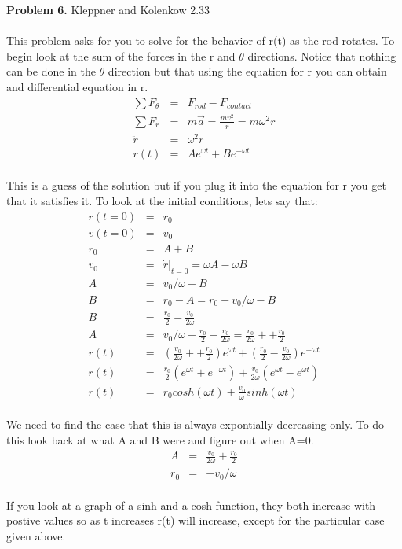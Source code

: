 \documentclass[11pt]{amsart}
\begin{document}
\textbf{Problem 6.} Kleppner and Kolenkow 2.33 \\ \\
This problem asks for you to solve for the behavior of r(t) as the rod rotates. To begin look at the sum of the forces in the r and $\theta$ directions. Notice that nothing can be done in the $\theta$ direction but that using the equation for r you can obtain and differential equation in r. \\
\begin{eqnarray*} 
\sum{F_{\theta}} &=& F_{rod}-F_{contact} \\
\sum{F_{r}} &=& m\vec{a} = \frac{mv^{2}}{r} = m\omega^{2}r \\ 
\ddot{r} &=& \omega^{2}r \\
r(t) &=& Ae^{\omega{t}}+Be^{-\omega{t}} 
\end{eqnarray*} \\
This is a guess of the solution but if you plug it into the equation for r you get that it satisfies it. To look at the initial conditions, lets say that: \\
\begin{eqnarray*}
r(t=0) &=& r_{0} \\
v(t=0) &=& v_{0} \\
r_{0} &=& A+B \\
v_{0} &=& \dot{r}|_{t=0} = \omega{A}-\omega{B} \\
A &=& v_{0}/\omega +B \\
B &=& r_{0}-A = r_{0} - v_{0}/\omega -B \\
B &=& \frac{r_{0}}{2} - \frac{v_{0}}{2\omega} \\
A &=& v_{0}/\omega+\frac{r_{0}}{2} - \frac{v_{0}}{2\omega} = \frac{v_{0}}{2\omega} + +\frac{r_{0}}{2}  \\
r(t) &=& (\frac{v_{0}}{2\omega} + +\frac{r_{0}}{2})e^{\omega{t}}+(\frac{r_{0}}{2} - \frac{v_{0}}{2\omega})e^{-\omega{t}} \\
r(t) &=& \frac{r_{0}}{2}(e^{\omega{t}}+e^{-\omega{t}})+\frac{v_{0}}{2\omega}(e^{\omega{t}}-e^{\omega{t}}) \\
r(t) &=& r_{0}cosh(\omega{t})+\frac{v_{0}}{\omega}sinh(\omega{t}) 
\end{eqnarray*}  \\
We need to find the case that this is always expontially decreasing only. To do this look back at what A and B were and figure out when A=0. \\ 
\begin{eqnarray*} 
A &=& \frac{v_{0}}{2\omega} +\frac{r_{0}}{2}  \\
r_{0} &=& -v_{0}/\omega 
\end{eqnarray*} \\
If you look at a graph of a sinh and a cosh function, they both increase with postive values so as t increases r(t) will increase, except for the particular case given above. \\ \\
\end{document}
